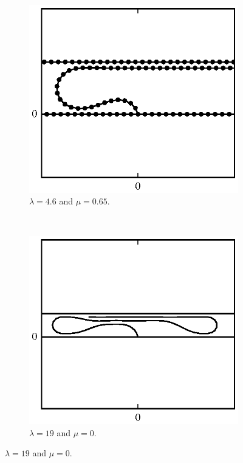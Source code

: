 {	\begin{figure}
		\centering
		\begin{subfigure}{.5\textwidth}
			\centering
			\includegraphics{./fig/ch3/push/b100/l4.6_m0.65.eps}
			\caption{$\lambda=4.6$ and $\mu=0.65$.\label{subfig:short_loop}}
		\end{subfigure}%
		~
		\begin{subfigure}{.5\textwidth}
			\centering
			\includegraphics{./fig/ch3/push/b100/l19_m0.eps}
			\caption{$\lambda=19$ and $\mu=0$.\label{subfig:hairpin}}
		\end{subfigure}


\end{figure}}

